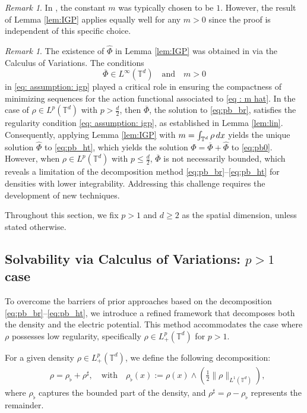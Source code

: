 \documentclass[11pt,reqno,a4paper]{amsart}
\newcommand{\intt}{\int_{\T^d}}
\theoremstyle{definition}
\theoremstyle{remark}
\newtheorem{remark}[lemma]{Remark}
\numberwithin{equation}{section}
\newcommand{\T} {\mathbb T}
\newcommand{\lt}{\left}
\newcommand{\rt}{\right}
\newcommand{\dx}{\textnormal{d}x}
\begin{document}
\begin{remark} In \cite{griffinpickeringiacobelli2021Torus}, the constant $m$ was typically chosen to be $1$. However, the result of Lemma \ref{lem:IGP} applies equally well for any $m>0$ since the proof is independent of this specific choice.
\end{remark}
 


\begin{remark}\label{rmk:cru}
The existence of $\widehat{\Phi}$  in Lemma \ref{lem:IGP} was obtained in \cite{griffinpickeringiacobelli2021Torus} via the Calculus of Variations. The conditions
\[
\overline{\Phi} \in L^\infty(\T^d)\quad\text{and}\quad m>0
\]
in \eqref{eq: assumption: igp} played a critical role in ensuring the compactness of minimizing sequences for the action functional associated to \eqref{eq : m hat}. In the case  of $\rho \in L^p(\T^d)$ with $p>\frac{d}{2}$, then $\overline{\Phi}$, the solution to \eqref{eq:pb_br}, satisfies the regularity condition \eqref{eq: assumption: igp}, as established in Lemma \ref{lem:lin}. Consequently, applying Lemma \ref{lem:IGP} with $m=\intt \rho\,\dx$ yields the unique solution $\widehat{\Phi}$ to \eqref{eq:pb_ht}, which yields the solution $\Phi=\overline{\Phi}+\widehat{\Phi}$ to \eqref{eq:pb0}. However, when $\rho \in L^p(\T^d)$ with $p \leq \frac d2$, $\overline{\Phi}$ is not necessarily bounded, which reveals a limitation of the decomposition method \eqref{eq:pb_br}--\eqref{eq:pb_ht} for densities with lower integrability. Addressing this challenge requires the development of new techniques.
\end{remark}


Throughout this section, we fix $p > 1$ and $d\ge2$ as the spatial dimension, unless stated otherwise.
%
%
%
%
%
\subsection{Solvability via Calculus of Variations: $p>1$ case}\label{ssec:cov}
To overcome the barriers of prior approaches based on the decomposition \eqref{eq:pb_br}--\eqref{eq:pb_ht}, we introduce a refined framework that decomposes both the density and the electric potential. This method accommodates the case where $\rho$ possesses low regularity, specifically $\rho \in L^p_+(\T^d)$ for $p > 1$.


For a given density $\rho\in L^p_+(\T^d)$, we define the following decomposition:
\begin{equation} \label{eq:rfl}
\begin{split}
    &\rho = \rho_{\flat} + \rho^\sharp, \quad \mbox{with} \quad \rho_\flat(x) :=  \rho(x) \wedge \lt(\frac{1}{2}\|\rho\|_{L^1(\T^d)}\rt),
    \end{split}
\end{equation}
where $\rho_{\flat}$ captures the bounded part of the density, and $\rho^\sharp = \rho - \rho_{\flat}$ represents the remainder. 
\end{document}
